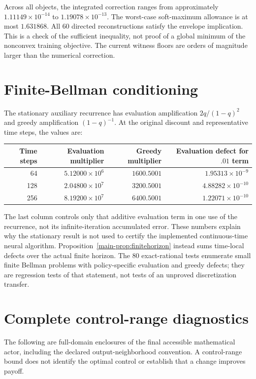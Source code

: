 Across all objects, the integrated correction ranges from approximately $1.11149\times10^{-14}$ to $1.19078\times10^{-13}$. The worst-case soft-maximum allowance is at most $1.631868$. All 60 directed reconstructions satisfy the envelope implication. This is a check of the sufficient inequality, not proof of a global minimum of the nonconvex training objective. The current witness floors are orders of magnitude larger than the numerical correction.

\section{Finite-Bellman conditioning}\label{supp:r18conditioning}
The stationary auxiliary recurrence has evaluation amplification $2q/(1-q)^2$ and greedy amplification $(1-q)^{-1}$. At the original discount and representative time steps, the values are:
\begin{center}\small
\begin{tabular}{rrrr}\toprule
Time steps & Evaluation multiplier & Greedy multiplier & Evaluation defect for $.01$ term\\\midrule
64 & $5.12000\times10^6$ & $1600.5001$ & $1.95313\times10^{-9}$\\
128 & $2.04800\times10^7$ & $3200.5001$ & $4.88282\times10^{-10}$\\
256 & $8.19200\times10^7$ & $6400.5001$ & $1.22071\times10^{-10}$\\\bottomrule
\end{tabular}
\end{center}
The last column controls only that additive evaluation term in one use of the recurrence, not its infinite-iteration accumulated error. These numbers explain why the stationary result is not used to certify the implemented continuous-time neural algorithm. Proposition~\ref{main-prop:finitehorizon} instead sums time-local defects over the actual finite horizon. The 80 exact-rational tests enumerate small finite Bellman problems with policy-specific evaluation and greedy defects; they are regression tests of that statement, not tests of an unproved discretization transfer.

\section{Complete control-range diagnostics}\label{supp:r18controls}
The following are full-domain enclosures of the final accessible mathematical actor, including the declared output-neighborhood convention. A control-range bound does not identify the optimal control or establish that a change improves payoff.


